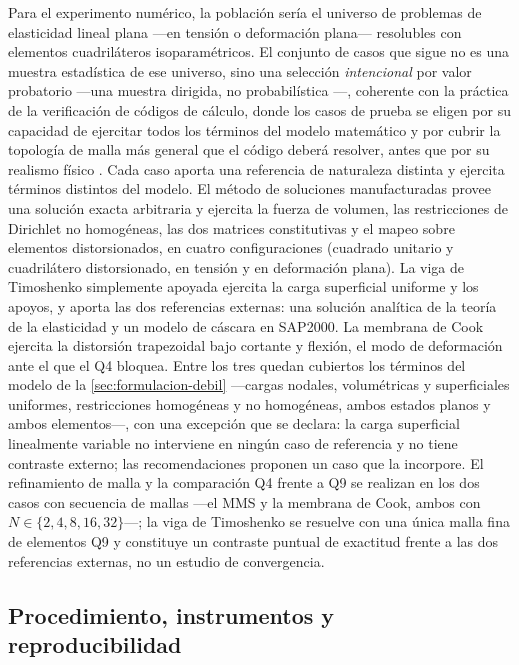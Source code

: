 Para el experimento numérico, la población sería el universo de problemas de elasticidad lineal plana —en tensión o deformación plana— resolubles con elementos cuadriláteros isoparamétricos. El conjunto de casos que sigue no es una muestra estadística de ese universo, sino una selección \emph{intencional} por valor probatorio —una muestra dirigida, no probabilística \autocite[p.~215]{sampieri2018metodologia}—, coherente con la práctica de la verificación de códigos de cálculo, donde los casos de prueba se eligen por su capacidad de ejercitar todos los términos del modelo matemático y por cubrir la topología de malla más general que el código deberá resolver, antes que por su realismo físico \autocite{oberkampf2010vv}. Cada caso aporta una referencia de naturaleza distinta y ejercita términos distintos del modelo. El método de soluciones manufacturadas provee una solución exacta arbitraria y ejercita la fuerza de volumen, las restricciones de Dirichlet no homogéneas, las dos matrices constitutivas y el mapeo sobre elementos distorsionados, en cuatro configuraciones (cuadrado unitario y cuadrilátero distorsionado, en tensión y en deformación plana). La viga de Timoshenko simplemente apoyada ejercita la carga superficial uniforme y los apoyos, y aporta las dos referencias externas: una solución analítica de la teoría de la elasticidad y un modelo de cáscara en SAP2000. La membrana de Cook ejercita la distorsión trapezoidal bajo cortante y flexión, el modo de deformación ante el que el Q4 bloquea. Entre los tres quedan cubiertos los términos del modelo de la \autoref{sec:formulacion-debil} —cargas nodales, volumétricas y superficiales uniformes, restricciones homogéneas y no homogéneas, ambos estados planos y ambos elementos—, con una excepción que se declara: la carga superficial linealmente variable no interviene en ningún caso de referencia y no tiene contraste externo; las recomendaciones proponen un caso que la incorpore. El refinamiento de malla y la comparación Q4 frente a Q9 se realizan en los dos casos con secuencia de mallas —el MMS y la membrana de Cook, ambos con $N\in\{2,4,8,16,32\}$—; la viga de Timoshenko se resuelve con una única malla fina de elementos Q9 y constituye un contraste puntual de exactitud frente a las dos referencias externas, no un estudio de convergencia.

\subsection{Procedimiento, instrumentos y reproducibilidad}
\label{sec:validacion-datos}

